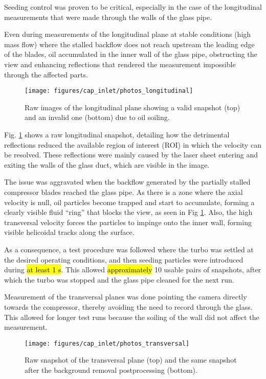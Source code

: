 Seeding control was proven to be critical, especially in the case of the longitudinal measurements that were made through the walls of the glass pipe.

Even during measurements of the longitudinal plane at stable conditions (high mass flow) where the stalled backflow does not reach upstream the leading edge of the blades, oil accumulated in the inner wall of the glass pipe, obstructing the view and enhancing reflections that rendered the measurement impossible through the affected parts. 

\begin{figure}[!t]
\centering
\texttt{[image: figures/cap\_inlet/photos\_longitudinal]}
\caption{Raw images of the longitudinal plane showing a valid snapshot (top) and an invalid one (bottom) due to oil soiling.}
\label{fig:photos_longitudinal}
\end{figure}

Fig. \ref{fig:photos_longitudinal} shows a raw longitudinal snapshot, detailing how the detrimental reflections reduced the available region of interest (ROI) in which the velocity can be resolved. These reflections were mainly caused by the laser sheet entering and exiting the walls of the glass duct, which are visible in the image.

The issue was aggravated when the backflow generated by the partially stalled compressor blades reached the glass pipe. As there is a zone where the axial velocity is null, oil particles become trapped and start to accumulate, forming a clearly visible fluid ``ring'' that blocks the view, as seen in Fig \ref{fig:photos_longitudinal}. Also, the high transversal velocity forces the particles to impinge onto the inner wall, forming visible helicoidal tracks along the surface.

As a consequence, a test procedure was followed where the turbo was settled at the desired operating conditions, and then seeding particles were introduced during \hl{at least 1 s}. This allowed \hl{approximately} 10 usable pairs of snapshots, after which the turbo was stopped and the glass pipe cleaned for the next run.

Measurement of the transversal planes was done pointing the camera directly towards the compressor, thereby avoiding the need to record through the glass. This allowed for longer test runs because the soiling of the wall did not affect the measurement. 

\begin{figure}[!t]
\centering
\texttt{[image: figures/cap\_inlet/photos\_transversal]}
\caption{Raw snapshot of the transversal plane (top) and the same snapshot after the background removal postprocessing (bottom).}
\label{fig:photos_transversal}
\end{figure}

